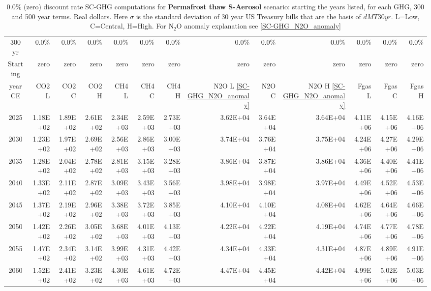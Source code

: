 \documentclass{article}
\begin{document}
\begin{table}
   \caption{0.0\% (zero) discount rate  SC-GHG computations for \textbf{Permafrost thaw S-Aerosol} scenario: starting the years listed, for each GHG, 300 and 500 year terms. Real dollars. Here $\sigma$ is the standard deviation of 30 year US Treasury bills that are the basis of $dMT30yr$. L=Low, C=Central, H=High. For N$_2$O anomaly explanation see \ref{SC-GHG_N2O_anomaly}} 
\label{PVs_300_yearSCC_SH0.0}
\small
\begin{tabular}{crrr|rrr|rrr|rrr}
300 yr   & 0.0\%    & 0.0\%    & 0.0\%    & 0.0\%    & 0.0\%    & 0.0\%    & 0.0\%    & 0.0\%    & 0.0\%    & 0.0\%    & 0.0\%    & 0.0\%    \\
Starting & zero     & zero     & zero     & zero     & zero     & zero     & zero     & zero     & zero     & zero     & zero     & zero     \\
year CE  & CO2 L    & CO2 C    & CO2 H    & CH4 L    & CH4 C    & CH4 H    & N2O L \ref{SC-GHG_N2O_anomaly}     & N2O C      & N2O H \ref{SC-GHG_N2O_anomaly}    & Fgas L   & Fgas C   & Fgas H   \\
2025     & 1.18E+02 & 1.89E+02 & 2.61E+02 & 2.34E+03 & 2.59E+03 & 2.73E+03 & 3.62E+04 & 3.64E+04 & 3.64E+04 & 4.11E+06 & 4.15E+06 & 4.16E+06 \\
2030     & 1.23E+02 & 1.97E+02 & 2.69E+02 & 2.56E+03 & 2.86E+03 & 3.00E+03 & 3.74E+04 & 3.76E+04 & 3.75E+04 & 4.24E+06 & 4.27E+06 & 4.29E+06 \\
2035     & 1.28E+02 & 2.04E+02 & 2.78E+02 & 2.81E+03 & 3.15E+03 & 3.28E+03 & 3.86E+04 & 3.87E+04 & 3.86E+04 & 4.36E+06 & 4.40E+06 & 4.41E+06 \\
2040     & 1.33E+02 & 2.11E+02 & 2.87E+02 & 3.09E+03 & 3.43E+03 & 3.56E+03 & 3.98E+04 & 3.98E+04 & 3.97E+04 & 4.49E+06 & 4.52E+06 & 4.53E+06 \\
2045     & 1.37E+02 & 2.19E+02 & 2.96E+02 & 3.38E+03 & 3.72E+03 & 3.85E+03 & 4.10E+04 & 4.10E+04 & 4.08E+04 & 4.62E+06 & 4.64E+06 & 4.66E+06 \\
2050     & 1.42E+02 & 2.26E+02 & 3.05E+02 & 3.68E+03 & 4.01E+03 & 4.13E+03 & 4.22E+04 & 4.22E+04 & 4.19E+04 & 4.74E+06 & 4.77E+06 & 4.78E+06 \\
2055     & 1.47E+02 & 2.34E+02 & 3.14E+02 & 3.99E+03 & 4.31E+03 & 4.42E+03 & 4.34E+04 & 4.33E+04 & 4.31E+04 & 4.87E+06 & 4.89E+06 & 4.91E+06 \\
2060     & 1.52E+02 & 2.41E+02 & 3.23E+02 & 4.30E+03 & 4.61E+03 & 4.72E+03 & 4.47E+04 & 4.45E+04 & 4.42E+04 & 4.99E+06 & 5.02E+06 & 5.03E+06 \\

\end{tabular}
\end{table}
\end{document}
